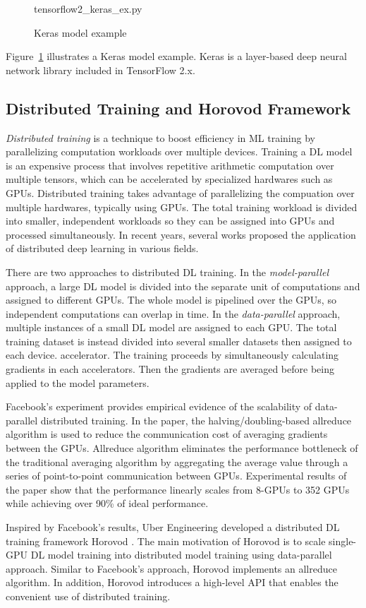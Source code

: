 \begin{figure}[ht!]

{tensorflow2_keras_ex.py}
  \caption{Keras model example}
\label{fig:back:keras}
\end{figure}

Figure~\ref{fig:back:keras} illustrates a Keras model example.
Keras is a layer-based deep neural network library included in TensorFlow 2.x.

\subsection{Distributed Training and Horovod Framework}

\textit{Distributed training} is a technique to boost efficiency in ML training
by parallelizing computation workloads over multiple devices.
Training a DL model is an expensive process that involves repetitive
arithmetic computation over multiple tensors,
which can be accelerated by specialized hardwares such as GPUs. 
Distributed training takes advantage of parallelizing the compuation over
multiple hardwares, typically using GPUs.
The total training workload is divided into smaller, independent workloads
so they can be assigned into GPUs and processed simultaneously. 
In recent years, several works proposed the application of distributed
deep learning in various fields.

There are two approaches to distributed DL training.
In the \textit{model-parallel} approach, a large DL model is divided into 
the separate unit of computations and assigned to different GPUs. 
The whole model is pipelined over the GPUs, so independent computations
can overlap in time.
In the \textit{data-parallel} approach, multiple instances of a small DL model
are assigned to each GPU. The total training dataset is instead
divided into several smaller datasets then assigned to each device.
accelerator. The training proceeds by simultaneously calculating gradients
in each accelerators. Then the gradients are averaged before being 
applied to the model parameters.

Facebook's experiment \cite{facebook2018} provides empirical evidence of
the scalability of data-parallel distributed training. In the paper, 
the halving/doubling-based allreduce algorithm is used to reduce the communication 
cost of averaging gradients between the GPUs. 
Allreduce algorithm eliminates the performance bottleneck of the traditional
averaging algorithm by aggregating the average value through a series of
point-to-point communication between GPUs. 
Experimental results of the paper show that the performance linearly
scales from 8-GPUs to 352 GPUs while achieving over 90\% of ideal performance.

Inspired by Facebook's results, Uber Engineering developed a distributed DL
training framework Horovod \cite{sergeev2018horovod}. 
The main motivation of Horovod is to scale single-GPU DL model training
into distributed model training using data-parallel approach. 
Similar to Facebook's approach, Horovod implements an allreduce algorithm. 
In addition, Horovod introduces a high-level API that enables
the convenient use of distributed training.  
